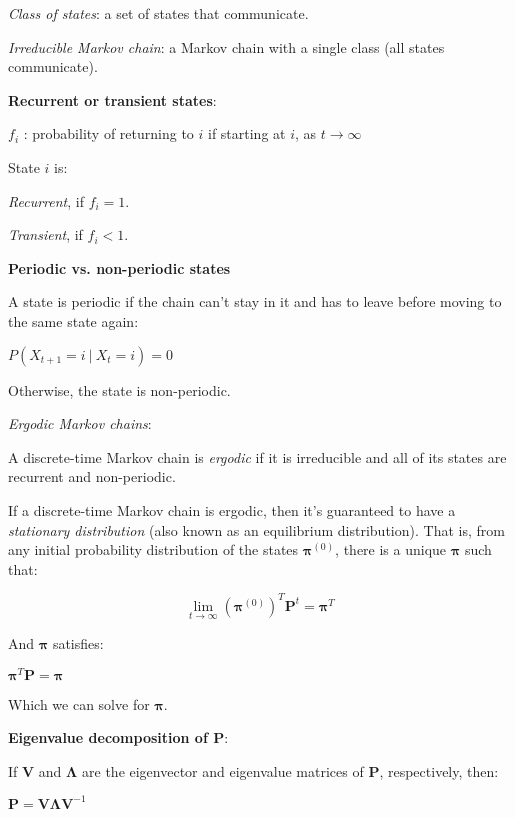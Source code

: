 \documentclass[12pt]{report}
\begin{document}
		\bigskip\emph{Class of states}: a set of states that communicate.
		
		\bigskip\emph{Irreducible Markov chain}: a Markov chain with a single class (all states communicate).
		
		\bigskip
		\bigskip\textbf{Recurrent or transient states}:
		
		\bigskip$f_i$ : probability of returning to $i$ if starting at $i$, as $t \rightarrow \infty$
		
		\bigskip State $i$ is:
		
		\bigskip\emph{Recurrent}, if $f_i = 1$.
		
		\emph{Transient}, if $f_i < 1$.
		
		\bigskip
		\bigskip\textbf{Periodic vs. non-periodic states}
		
		\bigskip A state is periodic if the chain can't stay in it and has to leave before moving to the same state again:
		
		\bigskip$P(X_{t+1} = i \ | \ X_{t} = i) = 0$
		
		\bigskip Otherwise, the state is non-periodic.
		
		\bigskip
		\bigskip\emph{Ergodic Markov chains}:
		
		\bigskip A discrete-time Markov chain is \emph{ergodic} if it is irreducible and all of its states are recurrent and non-periodic.
		
		\bigskip If a discrete-time Markov chain is ergodic, then it's guaranteed to have a \emph{stationary distribution} (also known as an equilibrium distribution). That is, from any initial probability distribution of the states $\boldsymbol{\pi}^{(0)}$, there is a unique $\boldsymbol{\pi}$ such that:
		
		\bigskip $$ \lim_{t \to\infty}(\boldsymbol{\pi}^{(0)})^T \mathbf{P}^t = \boldsymbol{\pi}^T$$ 		
		
		\bigskip And $\boldsymbol{\pi}$ satisfies:
		
		\bigskip$\boldsymbol{\pi}^T\mathbf{P} = \boldsymbol{\pi}$
		
		\bigskip Which we can solve for $\boldsymbol{\pi}$. 
		
		\bigskip
		\bigskip\textbf{Eigenvalue decomposition of $\mathbf{P}$}:
		
		\bigskip If $\mathbf{V}$ and $\mathbf{\Lambda}$ are the eigenvector and eigenvalue matrices of $\mathbf{P}$, respectively, then:
		
		\bigskip $\mathbf{P} = \mathbf{V} \mathbf{\Lambda} \mathbf{V}^{-1}$
		
\end{document}
